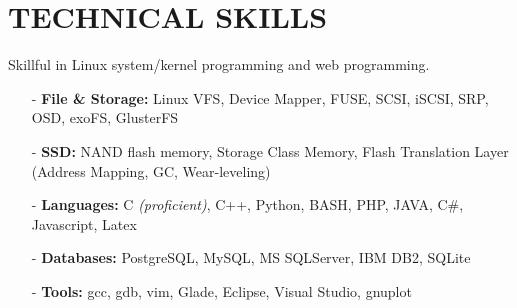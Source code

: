 \section{TECHNICAL SKILLS}
\vspace{0.03in}
Skillful in Linux system/kernel programming and web programming.
\begin{itemize}[leftmargin=*]
\setlength\itemsep{-0.02in}
\item[-] {\bf File \& Storage:} Linux VFS, Device Mapper, FUSE, SCSI, iSCSI, SRP, OSD,
exoFS, GlusterFS
\item[-] {\bf SSD:} NAND flash memory, Storage Class Memory,
	Flash Translation Layer (Address Mapping, GC, Wear-leveling)
\item[-] {\bf Languages:} C {\footnotesize \it (proficient)}, C++,
	Python, BASH, PHP, JAVA, C\#,
	Javascript, Latex
\item[-] {\bf Databases:} PostgreSQL, MySQL, MS SQLServer, IBM DB2, SQLite
\item[-] {\bf Tools:} gcc, gdb, vim, Glade, Eclipse, Visual Studio, gnuplot
\end{itemize}

